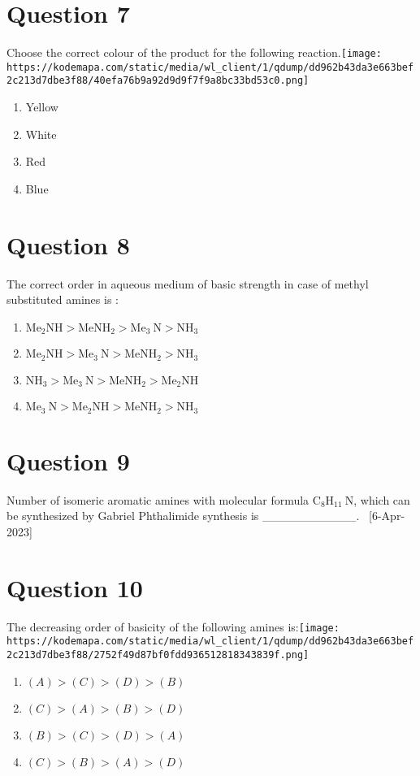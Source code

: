 \documentclass{article}
\begin{document}
\section*{Question 7}
Choose the correct colour of the product for the following reaction.\texttt{[image: https://kodemapa.com/static/media/wl\_client/1/qdump/dd962b43da3e663bef2c213d7dbe3f88/40efa76b9a92d9d9f7f9a8bc33bd53c0.png]}\newline
\begin{enumerate}[label=(\alph*)]
\item Yellow
\item White
\item Red
\item Blue
\end{enumerate}
\newpage
\section*{Question 8}
The correct order in aqueous medium of basic strength in case of methyl substituted amines is : 
\begin{enumerate}[label=(\alph*)]
\item \(\mathrm{Me}_2 \mathrm{NH}>\mathrm{MeNH}_2>\mathrm{Me}_3 \mathrm{~N}>\mathrm{NH}_3\)
\item \(\mathrm{Me}_2 \mathrm{NH}>\mathrm{Me}_3 \mathrm{~N}>\mathrm{MeNH}_2>\mathrm{NH}_3\)
\item \(\mathrm{NH}_3>\mathrm{Me}_3 \mathrm{~N}>\mathrm{MeNH}_2>\mathrm{Me}_2 \mathrm{NH}\)
\item \(\mathrm{Me}_3 \mathrm{~N}>\mathrm{Me}_2 \mathrm{NH}>\mathrm{MeNH}_2>\mathrm{NH}_3\)
\end{enumerate}
\newpage
\section*{Question 9}
Number of isomeric aromatic amines with molecular formula \(\mathrm{C}_8 \mathrm{H}_{11} \mathrm{~N}\), which can be synthesized by Gabriel Phthalimide synthesis is ___________.  [6-Apr-2023]
\begin{enumerate}[label=(\alph*)]
\end{enumerate}
\newpage
\section*{Question 10}
The decreasing order of basicity of the following amines is:\texttt{[image: https://kodemapa.com/static/media/wl\_client/1/qdump/dd962b43da3e663bef2c213d7dbe3f88/2752f49d87bf0fdd936512818343839f.png]}\newline
\begin{enumerate}[label=(\alph*)]
\item \((A)>(C)>(D)>(B)\)
\item \((C)>(A)>(B)>(D)\)
\item \((B)>(C)>(D)>(A)\)
\item \((C)>(B)>(A)>(D)\)
\end{enumerate}
\newpage
\end{document}
